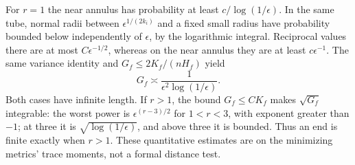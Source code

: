 \documentclass[11pt]{article}
\theoremstyle{remark}\newtheorem{remark}[theorem]{Remark}
\begin{document}
For $r=1$ the near annulus has probability at least
$c/\log(1/\epsilon)$. In the same tube, normal radii between
$\epsilon^{1/(2k_i)}$ and a fixed small radius have probability bounded
below independently of $\epsilon$, by the logarithmic integral.
Reciprocal values there are at most $C\epsilon^{-1/2}$, whereas on the
near annulus they are at least $c\epsilon^{-1}$. The same variance
identity and $G_f\leq2K_f/(nH_f)$ yield
\[
 G_f\asymp\frac1{\epsilon^2\log(1/\epsilon)}.
\]
Both cases have infinite length. If $r>1$, the bound
$G_f\leq C K_f$ makes $\sqrt{G_f}$ integrable: the worst power is
$\epsilon^{(r-3)/2}$ for $1<r<3$, with exponent greater than $-1$;
at three it is $\sqrt{\log(1/\epsilon)}$, and above three it is bounded.
Thus an end is finite exactly when $r>1$. These quantitative estimates
are on the minimizing metrics' trace moments, not a formal distance test.
\end{document}
